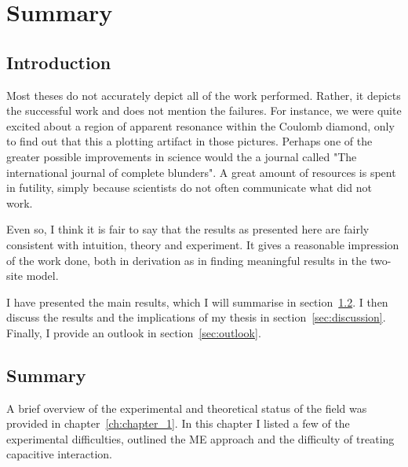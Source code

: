 \chapter{Summary}
\label{ch:chapter_5}





\newpage
\section{Introduction}
Most theses do not accurately depict all of the work performed. Rather, it depicts the successful work and does not mention the failures. For instance, we were quite excited about a region of apparent resonance within the Coulomb diamond, only to find out that this a plotting artifact in those pictures. Perhaps one of the greater possible improvements in science would the a journal called "The international journal of complete blunders". A great amount of resources is spent in futility, simply because scientists do not often communicate what did not work.

Even so, I think it is fair to say that the results as presented here are fairly consistent with intuition, theory and experiment. It gives a reasonable impression of the work done, both in derivation as in finding meaningful results in the two-site model. 

I have presented the main results, which I will summarise in section~\ref{sec:summary}. I then discuss the results and the implications of my thesis in section~\ref{sec:discussion}. Finally, I provide an outlook in section~\ref{sec:outlook}.


\section{Summary}
\label{sec:summary}
A brief overview of the experimental and theoretical status of the field was provided in chapter~\ref{ch:chapter_1}. In this chapter I listed a few of the experimental difficulties, outlined the ME approach and the difficulty of treating capacitive interaction.

